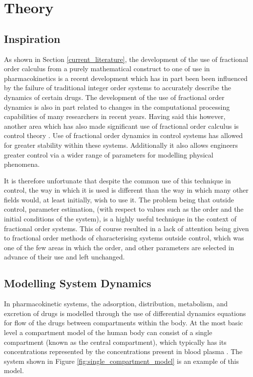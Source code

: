 \section{Theory}

\subsection{Inspiration} \label{Inspiration}
As shown in Section \ref{current_literature}, the development of the use of fractional order calculus from a purely mathematical construct to one of use in pharmacokinetics is a recent development which has in part been been influenced by the failure of traditional integer order systems to accurately describe the dynamics of certain drugs. The development of the use of fractional order dynamics is also in part related to changes in the computational processing capabilities of many researchers in recent years. Having said this however, another area which has also made significant use of fractional order calculus is control theory \cite{Fractional_order_control, FOC_Basics, control_theory_fractional_applications, fractional_control_tutorial}. Use of fractional order dynamics in control systems has allowed for greater stability within these systems. Additionally it also allows engineers greater control via a wider range of parameters for modelling physical phenomena.

It is therefore unfortunate that despite the common use of this technique in control, the way in which it is used is different than the way in which many other fields would, at least initially, wish to use it. The problem being that outside control, parameter estimation, (with respect to values such as the order and the initial conditions of the system), is a highly useful technique in the context of fractional order systems. This of course resulted in a lack of attention being given to fractional order methods of characterising systems outside control, which was one of the few areas in which the order, and other parameters are selected in advance of their use and left unchanged.

\subsection{Modelling System Dynamics} \label{Modelling_System_Dynamics}

In pharmacokinetic systems, the adsorption, distribution, metabolism, and excretion of drugs is modelled through the use of differential dynamics equations for flow of the drugs between compartments within the body. At the most basic level a compartment model of the human body can consist of a single compartment (known as the central compartment), which typically has its concentrations represented by the concentrations present in blood plasma \cite{Compartmental_modeling_in_Pharmacokinetics, One_Compartment_Open_Model}. The system shown in Figure \ref{fig:single_compartment_model} is an example of this model. 

